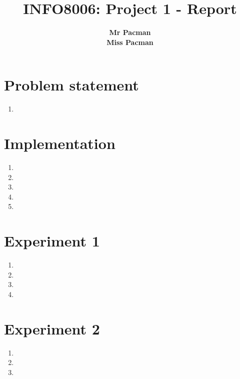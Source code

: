 \documentclass{article}
\begin{document}

\title{\Large{INFO8006: Project 1 - Report}}
\vspace{1cm}
\author{\small{\bf Mr Pacman} \\ \small{\bf Miss Pacman}}

\maketitle


\section{Problem statement}

\begin{enumerate}[label=\alph*.]
    \item 
\end{enumerate}

\section{Implementation}

\begin{enumerate}[label=\alph*.]
    \item 
    \item
    \item
    \item
    \item
\end{enumerate}

\section{Experiment 1}

\begin{enumerate}[label=\alph*.]
    \item 
    \item
    \item
    \item
\end{enumerate}

\section{Experiment 2}

\begin{enumerate}[label=\alph*.]
    \item 
    \item
    \item
\end{enumerate}





\end{document}
